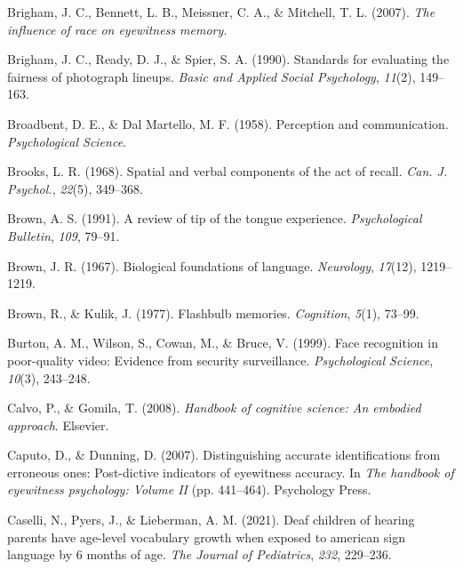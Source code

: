 \documentclass[
]{krantz}
\newlength{\cslhangindent}
\newlength{\cslentryspacingunit} %
\newenvironment{CSLReferences}[2] %
 {%
  \setlength{\parindent}{0pt}
  \ifodd #1
  \let\oldpar\par
  \def\par{\hangindent=\cslhangindent\oldpar}
  \fi
  \setlength{\parskip}{#2\cslentryspacingunit}
 }%
 {}
\begin{document}
\begin{CSLReferences}{1}{0}
\leavevmode{}%
Brigham, J. C., Bennett, L. B., Meissner, C. A., \& Mitchell, T. L. (2007). \emph{The influence of race on eyewitness memory.}

\leavevmode{}%
Brigham, J. C., Ready, D. J., \& Spier, S. A. (1990). Standards for evaluating the fairness of photograph lineups. \emph{Basic and Applied Social Psychology}, \emph{11}(2), 149--163.

\leavevmode{}%
Broadbent, D. E., \& Dal Martello, M. F. (1958). Perception and communication. \emph{Psychological Science}.

\leavevmode{}%
Brooks, L. R. (1968). Spatial and verbal components of the act of recall. \emph{Can. J. Psychol.}, \emph{22}(5), 349--368.

\leavevmode{}%
Brown, A. S. (1991). A review of tip of the tongue experience. \emph{Psychological Bulletin}, \emph{109}, 79--91.

\leavevmode{}%
Brown, J. R. (1967). Biological foundations of language. \emph{Neurology}, \emph{17}(12), 1219--1219.

\leavevmode{}%
Brown, R., \& Kulik, J. (1977). Flashbulb memories. \emph{Cognition}, \emph{5}(1), 73--99.

\leavevmode{}%
Burton, A. M., Wilson, S., Cowan, M., \& Bruce, V. (1999). Face recognition in poor-quality video: Evidence from security surveillance. \emph{Psychological Science}, \emph{10}(3), 243--248.

\leavevmode{}%
Calvo, P., \& Gomila, T. (2008). \emph{Handbook of cognitive science: An embodied approach}. Elsevier.

\leavevmode{}%
Caputo, D., \& Dunning, D. (2007). Distinguishing accurate identifications from erroneous ones: Post-dictive indicators of eyewitness accuracy. In \emph{The handbook of eyewitness psychology: Volume II} (pp. 441--464). Psychology Press.

\leavevmode{}%
Caselli, N., Pyers, J., \& Lieberman, A. M. (2021). Deaf children of hearing parents have age-level vocabulary growth when exposed to american sign language by 6 months of age. \emph{The Journal of Pediatrics}, \emph{232}, 229--236.


\end{CSLReferences}
\end{document}
